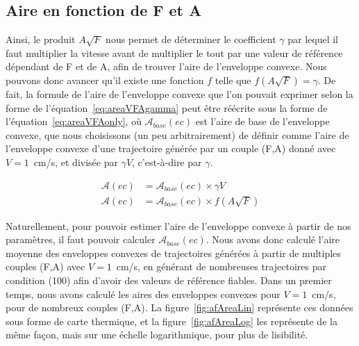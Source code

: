 	\FloatBarrier
	\subsection{Aire en fonction de F et A}
	Ainsi, le produit $A\sqrt{F}$ nous permet de déterminer le coefficient $\gamma$ par lequel il faut multiplier la vitesse avant de multiplier le tout par une valeur de référence dépendant de F et de A, afin de trouver l'aire de l'enveloppe convexe. Nous pouvons donc avancer qu'il existe une fonction $f$ telle que $f\left(A\sqrt{F}\right) = \gamma$. De fait, la formule de l'aire de l'enveloppe convexe que l'on pouvait exprimer selon la forme de l'équation~\ref{eq:areaVFAgamma} peut être réécrite sous la forme de l'équation~\ref{eq:areaVFAonly}, où $\mathcal{A}_{base}(ec)$ est l'aire \og de base \fg{} de l'enveloppe convexe, que nous choisissons (un peu arbitrairement) de définir comme l'aire de l'enveloppe convexe d'une trajectoire générée par un couple (F,A) donné avec $V = 1$~cm/s, et divisée par $\gamma{}V$, c'est-à-dire par $\gamma$.

	\begin{align}
		\label{eq:areaVFAgamma}
		\mathcal{A}(ec) &= \mathcal{A}_{base}(ec) \times \gamma{}V \\
		\label{eq:areaVFAonly}
		\mathcal{A}(ec) &= \mathcal{A}_{base}(ec) \times f\left(A\sqrt{F}\right)
	\end{align}
	
	Naturellement, pour pouvoir estimer l'aire de l'enveloppe convexe à partir de nos paramètres, il faut pouvoir calculer $\mathcal{A}_{base}(ec)$. Nous avons donc calculé l'aire moyenne des enveloppes convexes de trajectoires générées à partir de multiples couples (F,A) avec $V = 1$~cm/s, en générant de nombreuses trajectoires par condition (100) afin d'avoir des valeurs de référence fiables. Dans un premier temps, nous avons calculé les aires des enveloppes convexes pour $V = 1$~cm/s, pour de nombreux couples (F,A). La figure~\ref{fig:afAreaLin} représente ces données sous forme de carte thermique, et la figure~\ref{fig:afAreaLog} les représente de la même façon, mais sur une échelle logarithmique, pour plus de lisibilité.
	
